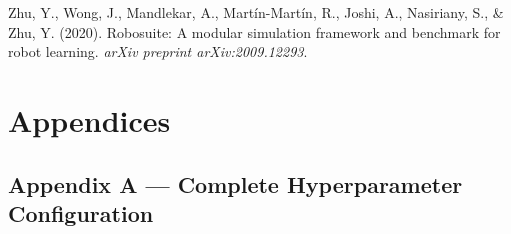 \documentclass[12pt,a4paper,oneside]{report}
\begin{document}
Zhu, Y., Wong, J., Mandlekar, A., Mart\'in-Mart\'in, R., Joshi, A., Nasiriany, S., \& Zhu, Y. (2020). Robosuite: A modular simulation framework and benchmark for robot learning. \emph{arXiv preprint arXiv:2009.12293}.

\newpage

\hypertarget{appendices}{%
\chapter{Appendices}\label{appendices}}

\hypertarget{appendix-a-complete-hyperparameter-configuration}{%
\section{Appendix A --- Complete Hyperparameter Configuration}\label{appendix-a-complete-hyperparameter-configuration}}
\end{document}
